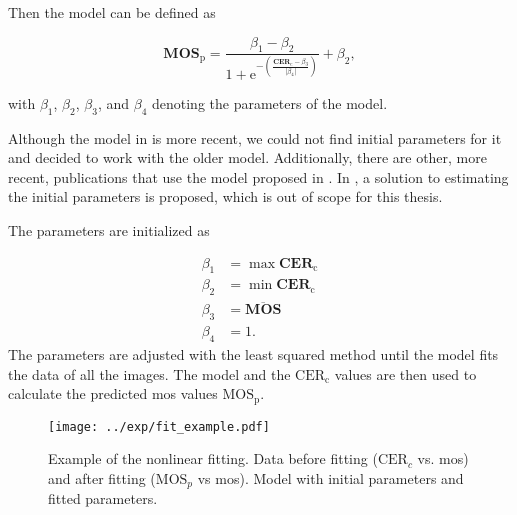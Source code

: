 Then the model can be defined as

\begin{equation}
    \mathbf{MOS}_{\text{p}} = \frac{\beta_{1}-\beta_{2}}{1 + \text{e}^{-\left(\frac{\mathbf{CER}_{\text{c}}-\beta_{3}}{|\beta_{4}|}\right)}} + \beta_{2},
    \label{eq:nonlinear}
\end{equation}


with $\beta_{1}$, $\beta_{2}$, $\beta_{3}$, and $\beta_{4}$ denoting the parameters of the model.

Although the model in \cite{nonlin_fit_original_2003} is more recent, we could not find initial parameters for it and decided to work with the older model.
Additionally, there are other, more recent, publications \cite{ni_esim_2017, nonlin_fit_appl_2017, nonlin_fit_appl_2018, nonlin_fit_appl_2014, nonlin_fit_appl_2011, nonlin_fit_appl_2015, doc_quality_survey_2023, iqa_database_2023, nonlin_fit_appl_2016} that use the model proposed in \cite{nonlin_fit_new_model_2006}.
In \cite{nonlin_fit_init_proof_2017}, a solution to estimating the initial parameters is proposed, which is out of scope for this thesis.


The parameters are initialized as
 
\begin{equation}
    \begin{aligned}
        \beta_{1} &= \max{\mathbf{CER}_{\text{c}}} \\
        \beta_{2} &= \min{\mathbf{CER}_{\text{c}}} \\
        \beta_{3} &= \overline{\mathbf{MOS}} \\
        \beta_{4} &= 1.
    \end{aligned}
    \label{eq:nonlinear_init}
\end{equation}
The parameters are adjusted with the least squared method until the model fits the data of all the images.
The model and the $\text{CER}_{\text{c}}$ values are then used to calculate the predicted \gls{mos} values $\text{MOS}_{\text{p}}$.

\begin{figure}[h]
    \centering
    \texttt{[image: ../exp/fit\_example.pdf]}
    \caption{Example of the nonlinear fitting. Data before fitting ($\text{CER}_{c}$ vs. \gls{mos}) and after fitting ($\text{MOS}_{p}$ vs \gls{mos}). Model with initial parameters and fitted parameters.}
    \label{fig:nonlinear_fit}
\end{figure}


